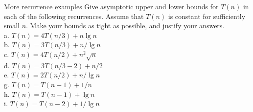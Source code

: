\documentclass[a4paper, justified]{tufte-handout}
\begin{document}
\begin{problem}
More recurrence examples Give asymptotic upper and lower bounds for $T(n)$ in each of the following recurrences. Assume that $T(n)$ is constant for sufficiently small $n .$ Make your bounds as tight as possible, and justify your answers.\\
a. $T(n)=4 T(n / 3)+n \lg n$\\
b. $T(n)=3 T(n / 3)+n / \lg n$\\
c. $T(n)=4 T(n / 2)+n^{2} \sqrt{n}$\\
d. $T(n)=3 T(n / 3-2)+n / 2$\\
e. $T(n)=2 T(n / 2)+n / \lg n$\\
g. $T(n)=T(n-1)+1 / n$\\
h. $T(n)=T(n-1)+\lg n$\\
i. $T(n)=T(n-2)+1 / \lg n$
\end{problem}
\end{document}
